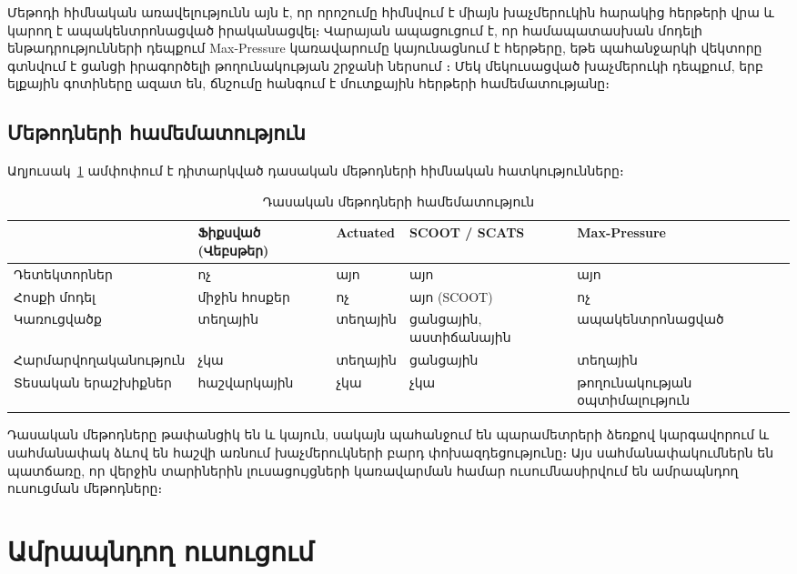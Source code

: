 \documentclass[12pt,a4paper]{extreport}
\begin{document}
Մեթոդի հիմնական առավելությունն այն է, որ որոշումը հիմնվում է միայն խաչմերուկին հարակից հերթերի վրա և կարող է ապակենտրոնացված իրականացվել։ Վարայան ապացուցում է, որ համապատասխան մոդելի ենթադրությունների դեպքում Max-Pressure կառավարումը կայունացնում է հերթերը, եթե պահանջարկի վեկտորը գտնվում է ցանցի իրագործելի թողունակության շրջանի ներսում \cite{varaiya2013}։ Մեկ մեկուսացված խաչմերուկի դեպքում, երբ ելքային գոտիները ազատ են, ճնշումը հանգում է մուտքային հերթերի համեմատությանը։

\subsection{Մեթոդների համեմատություն}

Աղյուսակ~\ref{tab:classic} ամփոփում է դիտարկված դասական մեթոդների հիմնական հատկությունները։

\begin{table}[ht]
\centering
\small
\begin{tabular}{|p{3cm}|p{2.6cm}|p{2.6cm}|p{2.6cm}|p{2.6cm}|}
\hline
 & Ֆիքսված (Վեբսթեր) & Actuated & SCOOT / SCATS & Max-Pressure \\
\hline
Դետեկտորներ & ոչ & այո & այո & այո \\
\hline
Հոսքի մոդել & միջին հոսքեր & ոչ & այո (SCOOT) & ոչ \\
\hline
Կառուցվածք & տեղային & տեղային & ցանցային, աստիճանային & ապակենտրոնացված \\
\hline
Հարմարվողականություն & չկա & տեղային & ցանցային & տեղային \\
\hline
Տեսական երաշխիքներ & հաշվարկային & չկա & չկա & թողունակության օպտիմալություն\footnotemark \\
\hline
\end{tabular}
\caption{Դասական մեթոդների համեմատություն}
\label{tab:classic}
\end{table}

Դասական մեթոդները թափանցիկ են և կայուն, սակայն պահանջում են պարամետրերի ձեռքով կարգավորում և սահմանափակ ձևով են հաշվի առնում խաչմերուկների բարդ փոխազդեցությունը։ Այս սահմանափակումներն են պատճառը, որ վերջին տարիներին լուսացույցների կառավարման համար ուսումնասիրվում են ամրապնդող ուսուցման մեթոդները։

\section{Ամրապնդող ուսուցում}
\end{document}
